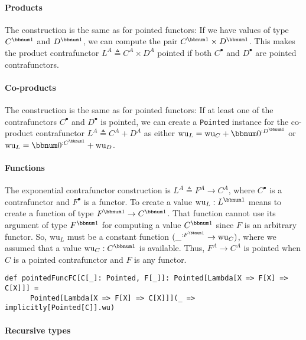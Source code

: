 \paragraph{Products}

The construction is the same as for pointed functors: If we have values
of type $C^{\bbnum 1}$ and $D^{\bbnum 1}$, we can compute the pair
$C^{\bbnum 1}\times D^{\bbnum 1}$. This makes the product contrafunctor
$L^{A}\triangleq C^{A}\times D^{A}$ pointed if both $C^{\bullet}$
and $D^{\bullet}$ are pointed contrafunctors.

\paragraph{Co-products}

The construction is the same as for pointed functors: If at least
one of the contrafunctors $C^{\bullet}$ and $D^{\bullet}$ is pointed,
we can create a \lstinline!Pointed! instance for the co-product contrafunctor
$L^{A}\triangleq C^{A}+D^{A}$ as either $\text{wu}_{L}=\text{wu}_{C}+\bbnum 0^{:D^{\bbnum 1}}$
or $\text{wu}_{L}=\bbnum 0^{:C^{\bbnum 1}}+\text{wu}_{D}$.

\paragraph{Functions}

The exponential contrafunctor construction is $L^{A}\triangleq F^{A}\rightarrow C^{A}$,
where $C^{\bullet}$ is a contrafunctor and $F^{\bullet}$ is a functor.
To create a value $\text{wu}_{L}:L^{\bbnum 1}$ means to create a
function of type $F^{\bbnum 1}\rightarrow C^{\bbnum 1}$. That function
cannot use its argument of type $F^{\bbnum 1}$ for computing a value
$C^{\bbnum 1}$ since $F$ is an arbitrary functor. So, $\text{wu}_{L}$
must be a constant function $(\_^{:F^{\bbnum 1}}\rightarrow\text{wu}_{C})$,
where we assumed that a value $\text{wu}_{C}:C^{\bbnum 1}$ is available.
Thus, $F^{A}\rightarrow C^{A}$ is pointed when $C$ is a pointed
contrafunctor and $F$ is any functor.
\begin{lstlisting}
def pointedFuncFC[C[_]: Pointed, F[_]]: Pointed[Lambda[X => F[X] => C[X]]] =
      Pointed[Lambda[X => F[X] => C[X]]](_ => implicitly[Pointed[C]].wu)
\end{lstlisting}


\paragraph{Recursive types}

